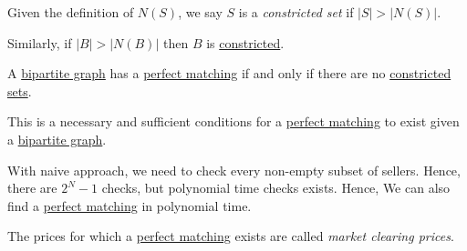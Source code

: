 \begin{definition}\label{def:constricted-set}
	Given the definition of \(N(S)\), we say \(S\) is a \emph{constricted set} if \(\left\vert S \right\vert > \left\vert N(S) \right\vert \).
\end{definition}

\begin{note}
	Similarly, if \(\left\vert B \right\vert > \left\vert N(B) \right\vert \) then \(B\) is \hyperref[def:constricted-set]{constricted}.
\end{note}


\begin{theorem}\label{thm:Konig-Hall-maximize-theorem}
	A \href{https://en.wikipedia.org/wiki/Bipartite_graph}{bipartite graph} has a \hyperref[def:perfect-matching]{perfect matching} if and only if there are no \hyperref[def:constricted-set]{constricted sets}.
\end{theorem}
\begin{note}
	This is a necessary and sufficient conditions for a \hyperref[def:perfect-matching]{perfect matching} to exist given a \href{https://en.wikipedia.org/wiki/Bipartite_graph}{bipartite graph}.
\end{note}

\begin{remark}
	With naive approach, we need to check every non-empty subset of sellers. Hence, there are \(2^N - 1\) checks, but polynomial time checks exists. Hence, We can also find a \hyperref[def:perfect-matching]{perfect matching} in polynomial time.

	\begin{note}\label{note:market-clearing-prices}
		The prices for which a \hyperref[def:perfect-matching]{perfect matching} exists are called \emph{market clearing prices}.
	\end{note}
\end{remark}